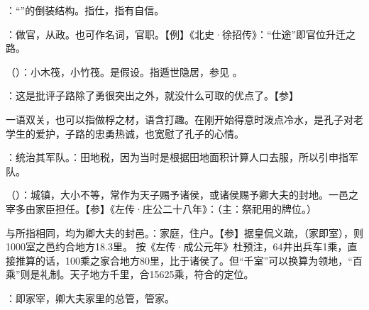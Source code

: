 {
\item {}：“”的倒装结构。指仕，指有自信。

\item {}：做官，从政。也可作名词，官职。【例】《北史·徐招传》：“仕途”即官位升迁之路。
}
{}


{
\item {}（）：小木筏，小竹筏。是假设。指遁世隐居，参见 。
\item {}：这是批评子路除了勇很突出之外，就没什么可取的优点了。【参】

一语双关，也可以指做桴之材，语含打趣。在刚开始得意时泼点冷水，是孔子对老学生的爱护，子路的忠勇热诚，也宽慰了孔子的心情。
}
{}


{
\item {}：统治其军队。：田地税，因为当时是根据田地面积计算人口去服，所以引申指军队。

\item {}（）：城镇，大小不等，常作为天子赐予诸侯，或诸侯赐予卿大夫的封地。一邑之宰多由家臣担任。【参】《左传·庄公二十八年》：（主：祭祀用的牌位。）

与所指相同，均为卿大夫的封邑。：家庭，住户。【参】据皇侃义疏，（家即室），则1000室之邑约合地方18.3里。
按《左传·成公元年》杜预注，64井出兵车1乘，直接推算的话，100乘之家合地方80里，比于诸侯了。但“千室”可以换算为领地，“百乘”则是礼制。天子地方千里，合15625乘，符合的定位。

\item {}：即家宰，卿大夫家里的总管，管家。
}
{}


